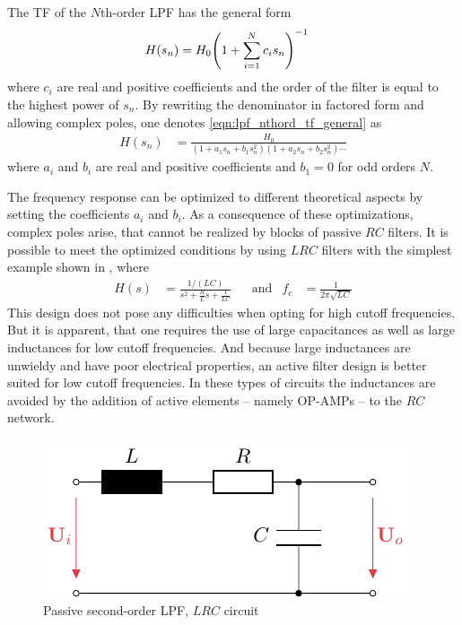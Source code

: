 The \ac{TF} of the $N$th-order \ac{LPF} has the general form
\begin{align}
    H(s_n) &= H_0 \pqty{1 + \sum\limits_{i=1}^N c_i s_n}^{-1} \label{eqn:lpf_nthord_tf_general}
\end{align}
where $c_i$ are real and positive coefficients and the order of the filter is equal to the highest power of $s_n$. By rewriting the denominator in factored form and allowing complex poles, one denotes \autoref{eqn:lpf_nthord_tf_general} as
\begin{align}
    H(s_n) &= \frac{H_0}{(1+a_1s_n+b_1s_n^2)(1+a_2s_n+b_2s_n^2)\cdots} \label{eqn:lpf_nthord_tf_poles}
\end{align}
where $a_i$ and $b_i$ are real and positive coefficients and $b_1=0$ for odd orders $N$.

The frequency response can be optimized to different theoretical aspects by setting the coefficients $a_i$ and $b_i$. As a consequence of these optimizations, complex poles arise, that cannot be realized by blocks of passive $RC$ filters. It is possible to meet the optimized conditions by using $LRC$ filters with the simplest example shown in , where
\begin{align}
    H(s) &= \frac{1/(LC)}{s^2+\frac{R}{L}s+\frac{1}{LC}} &&\text{and} &f_c &= \frac{1}{2\pi\sqrt{LC}}
\end{align}
This design does not pose any difficulties when opting for high cutoff frequencies. But it is apparent, that one requires the use of large capacitances as well as large inductances for low cutoff frequencies. And because large inductances are unwieldy and have poor electrical properties, an active filter design is better suited for low cutoff frequencies. In these types of circuits the inductances are avoided by the addition of active elements -- namely \ac{OP-AMP}s -- to the $RC$ network.

\begin{figure}[htb!]
    \centering
    \includegraphics[scale=1]{figures/electronics/lowpass/lp_passive_2ord/lp_passive_2ord}
    \caption[Passive second-order \ac{LPF}]{Passive second-order \ac{LPF}, $LRC$ circuit}
    \label{fig:lp_passive_2ord}
\end{figure}


